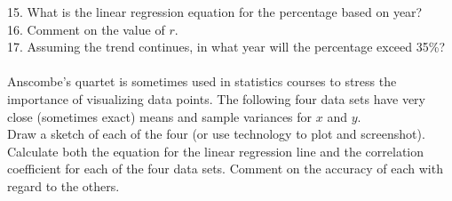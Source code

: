 \documentclass[11pt]{article}
\begin{document}
15. What is the linear regression equation for the percentage based on year?   \\[1in]

16. Comment on the value of $r$.    \\[1in]

17. Assuming the trend continues, in what year will the percentage exceed 35\%? \\[1in]


   \newline\\

Anscombe's quartet is sometimes used in statistics courses to stress the importance of visualizing data points. The following four data sets have very close (sometimes exact) means and sample variances for $x$ and $y$.    \newline\\

Draw a sketch of each of the four (or use technology to plot and screenshot). Calculate both the equation for the linear regression line and the correlation coefficient for each of the four data sets. Comment on the accuracy of each with regard to the others.   \newline\\
\end{document}
